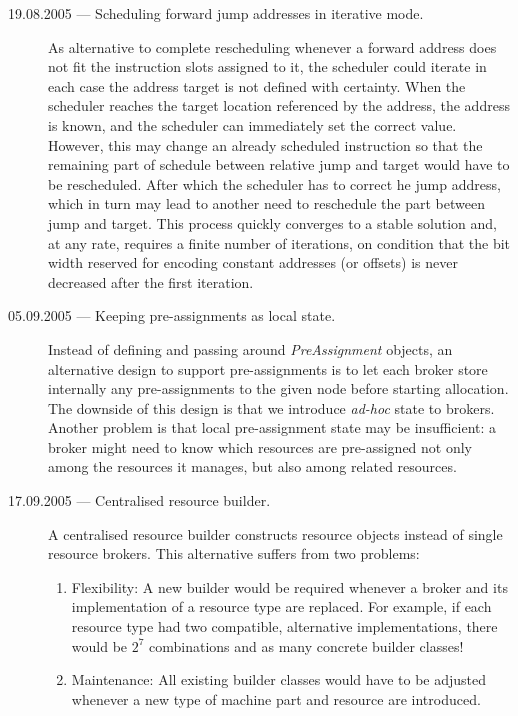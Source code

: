\documentclass[a4paper,twoside]{tce}
\begin{document}
\begin{description}
\item[19.08.2005 --- Scheduling forward jump addresses in iterative mode.] %
  As alternative to complete re\-scheduling whenever a forward address does
  not fit the instruction slots assigned to it, the scheduler could iterate
  in each case the address target is not defined with certainty. When the
  scheduler reaches the target location referenced by the address, the
  address is known, and the scheduler can immediately set the correct value.
  However, this may change an already scheduled instruction so that the
  remaining part of schedule between relative jump and target would have to
  be rescheduled. After which the scheduler has to correct he jump address,
  which in turn may lead to another need to reschedule the part between jump
  and target. This process quickly converges to a stable solution and, at
  any rate, requires a finite number of iterations, on condition that the
  bit width reserved for encoding constant addresses (or offsets) is never
  decreased after the first iteration.
\item[05.09.2005 --- Keeping pre-assignments as local state.] %
  Instead of defining and passing around \emph{PreAssignment} objects, an
  alternative design to support pre-assignments is to let each broker store
  internally any pre-assignments to the given node before starting
  allocation. The downside of this design is that we introduce \emph{ad-hoc}
  state to brokers. Another problem is that local pre-assignment state may
  be insufficient: a broker might need to know which resources are
  pre-assigned not only among the resources it manages, but also among
  related resources.
\item[17.09.2005 --- Centralised resource builder.]%
  A centralised resource builder constructs resource objects instead of
  single resource brokers. This alternative suffers from two problems:
  \begin{enumerate}
  \item %
    Flexibility: A new builder would be required whenever a broker and its
    implementation of a resource type are replaced. For example, if each
    resource type had two compatible, alternative implementations, there
    would be $2^7$ combinations and as many concrete builder classes!
  \item %
    Maintenance: All existing builder classes would have to be adjusted
    whenever a new type of machine part and resource are introduced.
  \end{enumerate}

\end{description}
\end{document}
